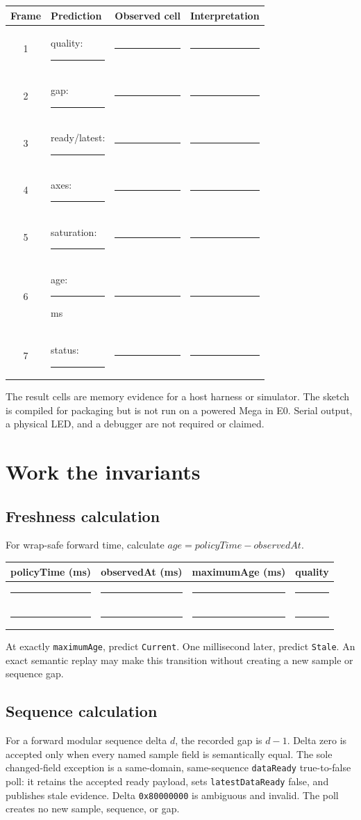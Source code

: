 \documentclass[11pt]{article}
\newcommand{\blankline}{\rule{0.9in}{0.4pt}}
\begin{document}
\begin{tabularx}{\linewidth}{@{}c l l X@{}}
\toprule
Frame & Prediction & Observed cell & Interpretation\\
\midrule
1 & quality: \blankline & \blankline & \blankline\\[5pt]
2 & gap: \blankline & \blankline & \blankline\\[5pt]
3 & ready/latest: \blankline & \blankline & \blankline\\[5pt]
4 & axes: \blankline & \blankline & \blankline\\[5pt]
5 & saturation: \blankline & \blankline & \blankline\\[5pt]
6 & age: \blankline ms & \blankline & \blankline\\[5pt]
7 & status: \blankline & \blankline & \blankline\\
\bottomrule
\end{tabularx}

The result cells are memory evidence for a host harness or simulator. The
sketch is compiled for packaging but is not run on a powered Mega in E0.
Serial output, a physical LED, and a debugger are not required or claimed.

\newpage
\section{Work the invariants}
\subsection*{Freshness calculation}
For wrap-safe forward time, calculate
\(\mathit{age}=\mathit{policyTime}-\mathit{observedAt}\).

\begin{tabularx}{\linewidth}{@{}X X X X@{}}
\toprule
policyTime (ms) & observedAt (ms) & maximumAge (ms) & quality\\
\midrule
\rule{0pt}{16pt}\blankline & \blankline & \blankline & \blankline\\[9pt]
\blankline & \blankline & \blankline & \blankline\\
\bottomrule
\end{tabularx}

At exactly \texttt{maximumAge}, predict \texttt{Current}. One millisecond
later, predict \texttt{Stale}. An exact semantic replay may make this
transition without creating a new sample or sequence gap.

\subsection*{Sequence calculation}
For a forward modular sequence delta \(d\), the recorded gap is \(d-1\).
Delta zero is accepted only when every named sample field is semantically
equal. The sole changed-field exception is a same-domain, same-sequence
\texttt{dataReady} true-to-false poll: it retains the accepted ready payload,
sets \texttt{latestDataReady} false, and publishes stale evidence. Delta
\texttt{0x80000000} is ambiguous and invalid. The poll creates no new sample,
sequence, or gap.
\end{document}
